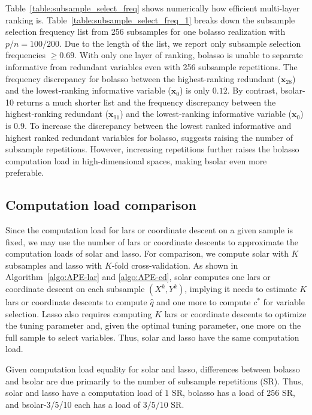 \documentclass[11pt,review,authoryear]{elsarticle}
\begin{document}
Table~\ref{table:subsample_select_freq} shows numerically how efficient multi-layer ranking is. Table~\ref{table:subsample_select_freq_1} breaks down the subsample selection frequency list from 256 subsamples for one bolasso realization with $p/n=100/200$. Due to the length of the list, we report only subsample selection frequencies $\ge0.69$. With only one layer of ranking, bolasso is unable to separate informative from redundant variables even with 256 subsample repetitions. The frequency discrepancy for bolasso between the highest-ranking redundant ($\mathbf{x}_{28}$) and the lowest-ranking informative variable ($\mathbf{x}_0$) is only $0.12$. By contrast, bsolar-10 returns a much shorter list and the frequency discrepancy between the highest-ranking redundant ($\mathbf{x}_{91}$) and the lowest-ranking informative variable ($\mathbf{x}_0$) is $0.9$. To increase the discrepancy between the lowest ranked informative and highest ranked redundant variables for bolasso, \citet{bach2008bolasso} suggests raising the number of subsample repetitions. However, increasing repetitions further raises the bolasso computation load in high-dimensional spaces, making bsolar even more preferable.

\subsection{Computation load comparison \label{subsection:comp}}

Since the computation load for lars or coordinate descent on a given sample is fixed, we may use the number of lars or coordinate descents to approximate the computation loads of solar and lasso. For comparison, we compute solar with $K$ subsamples and lasso with $K$-fold cross-validation. As shown in Algorithm~\ref{algo:APE-lar} and \ref{algo:APE-cd}, solar computes one lars or coordinate descent on each subsample $(X^k, Y^k)$, implying it needs to estimate $K$ lars or coordinate descents to compute $\widehat{q}$ and one more to compute $c^*$ for variable selection. Lasso also requires computing $K$ lars or coordinate descents to optimize the tuning parameter and, given the optimal tuning parameter, one more on the full sample to select variables. Thus, solar and lasso have the same computation load.

Given computation load equality for solar and lasso, differences between bolasso and bsolar are due primarily to the number of subsample repetitions (SR). Thus, solar and lasso have a computation load of $1$ SR, bolasso has a load of $256$ SR, and bsolar-3/5/10 each has a load of $3/5/10$ SR.
\end{document}
